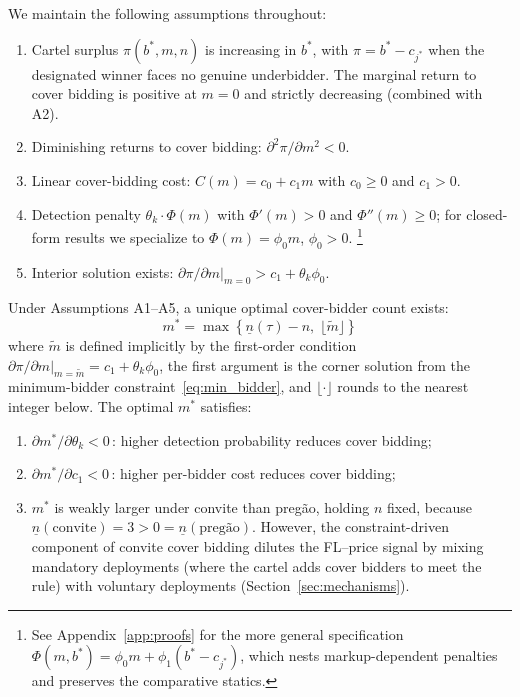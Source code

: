 \noindent We maintain the following assumptions throughout:

\begin{enumerate}
  \item[\textbf{A1.}] Cartel surplus $\pi(b^*, m, n)$ is increasing in $b^*$, with $\pi = b^* - c_{j^*}$ when the designated winner faces no genuine underbidder. The marginal return to cover bidding is positive at $m = 0$ and strictly decreasing (combined with A2).
  \item[\textbf{A2.}] Diminishing returns to cover bidding: $\partial^2 \pi / \partial m^2 < 0$.
  \item[\textbf{A3.}] Linear cover-bidding cost: $C(m) = c_0 + c_1 m$ with $c_0 \geq 0$ and $c_1 > 0$.
  \item[\textbf{A4.}] Detection penalty $\theta_k \cdot \Phi(m)$ with $\Phi'(m) > 0$ and $\Phi''(m) \geq 0$; for closed-form results we specialize to $\Phi(m) = \phi_0 m$, $\phi_0 > 0$.%
    \footnote{See Appendix~\ref{app:proofs} for the more general specification $\Phi(m, b^*) = \phi_0 m + \phi_1 (b^* - c_{j^*})$, which nests markup-dependent penalties and preserves the comparative statics.}
  \item[\textbf{A5.}] Interior solution exists: $\partial \pi / \partial m \big|_{m=0} > c_1 + \theta_k \phi_0$.
\end{enumerate}

\begin{proposition}
\label{prop:optimal_m}
Under Assumptions A1--A5, a unique optimal cover-bidder count exists:
\begin{equation}
  m^* = \max\!\left\{\underline{n}(\tau) - n, \;
  \lfloor \tilde{m} \rfloor \right\}
  \label{eq:optimal_m}
\end{equation}
where $\tilde{m}$ is defined implicitly by the first-order condition
$\partial \pi / \partial m \big|_{m = \tilde{m}} = c_1 + \theta_k
\phi_0$, the first argument is the corner solution from the
minimum-bidder constraint~\eqref{eq:min_bidder}, and $\lfloor \cdot
\rfloor$ rounds to the nearest integer below. The optimal $m^*$
satisfies:
\begin{enumerate}
  \item[(i)] $\partial m^* / \partial \theta_k < 0$\,: higher detection
    probability reduces cover bidding;
  \item[(ii)] $\partial m^* / \partial c_1 < 0$\,: higher per-bidder
    cost reduces cover bidding;
  \item[(iii)] $m^*$ is weakly larger under convite than preg\~ao,
    holding $n$ fixed, because $\underline{n}(\text{convite}) = 3 >
    0 = \underline{n}(\text{preg\~ao})$. However, the
    constraint-driven component of convite cover bidding dilutes the
    FL--price signal by mixing mandatory deployments (where the cartel
    adds cover bidders to meet the rule) with voluntary deployments
    (Section~\ref{sec:mechanisms}).
\end{enumerate}
\end{proposition}

